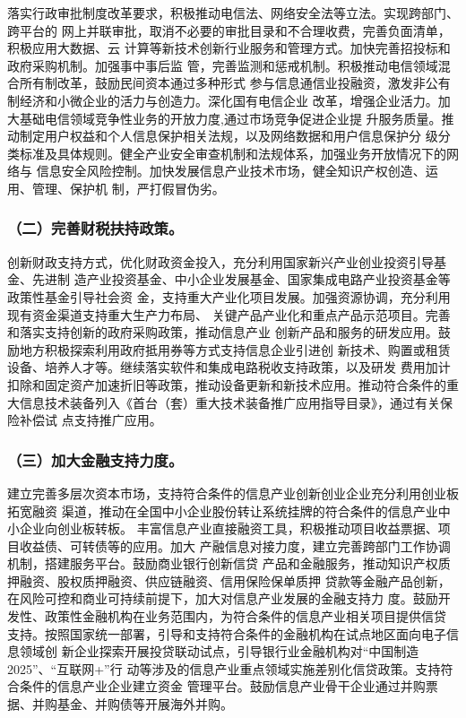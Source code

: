 \documentclass[11pt]{ctexart}
\begin{document}
{{{{落实行政审批制度改革要求，积极推动电信法、网络安全法等立法。实现跨部门、跨平台的
网上并联审批，取消不必要的审批目录和不合理收费，完善负面清单，积极应用大数据、云
计算等新技术创新行业服务和管理方式。加快完善招投标和政府采购机制。加强事中事后监
管，完善监测和惩戒机制。积极推动电信领域混合所有制改革，鼓励民间资本通过多种形式
参与信息通信业投融资，激发非公有制经济和小微企业的活力与创造力。深化国有电信企业
改革，增强企业活力。加大基础电信领域竞争性业务的开放力度,通过市场竞争促进企业提
升服务质量。推动制定用户权益和个人信息保护相关法规，以及网络数据和用户信息保护分
级分类标准及具体规则。健全产业安全审查机制和法规体系，加强业务开放情况下的网络与
信息安全风险控制。加快发展信息产业技术市场，健全知识产权创造、运用、管理、保护机
制，严打假冒伪劣。

\subsubsection{（二）完善财税扶持政策。}
\label{sec:orgc771a8a}

创新财政支持方式，优化财政资金投入，充分利用国家新兴产业创业投资引导基金、先进制
造产业投资基金、中小企业发展基金、国家集成电路产业投资基金等政策性基金引导社会资
金，支持重大产业化项目发展。加强资源协调，充分利用现有资金渠道支持重大生产力布局、
关键产品产业化和重点产品示范项目。完善和落实支持创新的政府采购政策，推动信息产业
创新产品和服务的研发应用。鼓励地方积极探索利用政府抵用券等方式支持信息企业引进创
新技术、购置或租赁设备、培养人才等。继续落实软件和集成电路税收支持政策，以及研发
费用加计扣除和固定资产加速折旧等政策，推动设备更新和新技术应用。推动符合条件的重
大信息技术装备列入《首台（套）重大技术装备推广应用指导目录》，通过有关保险补偿试
点支持推广应用。

\subsubsection{（三）加大金融支持力度。}
\label{sec:orgd54895b}

建立完善多层次资本市场，支持符合条件的信息产业创新创业企业充分利用创业板拓宽融资
渠道，推动在全国中小企业股份转让系统挂牌的符合条件的信息产业中小企业向创业板转板。
丰富信息产业直接融资工具，积极推动项目收益票据、项目收益债、可转债等的应用。加大
产融信息对接力度，建立完善跨部门工作协调机制，搭建服务平台。鼓励商业银行创新信贷
产品和金融服务，推动知识产权质押融资、股权质押融资、供应链融资、信用保险保单质押
贷款等金融产品创新，在风险可控和商业可持续前提下，加大对信息产业发展的金融支持力
度。鼓励开发性、政策性金融机构在业务范围内，为符合条件的信息产业相关项目提供信贷
支持。按照国家统一部署，引导和支持符合条件的金融机构在试点地区面向电子信息领域创
新企业探索开展投贷联动试点，引导银行业金融机构对“中国制造2025”、“互联网+”行
动等涉及的信息产业重点领域实施差别化信贷政策。支持符合条件的信息产业企业建立资金
管理平台。鼓励信息产业骨干企业通过并购票据、并购基金、并购债等开展海外并购。

}}}}
\end{document}
